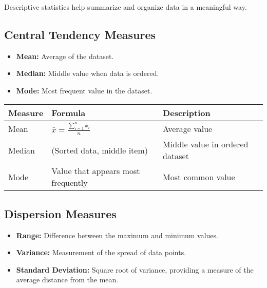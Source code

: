 \documentclass[
  letterpaper,
  DIV=11,
  numbers=noendperiod]{scrreprt}
\providecommand{\tightlist}{%
  \setlength{\itemsep}{0pt}\setlength{\parskip}{0pt}}
\begin{document}
Descriptive statistics help summarize and organize data in a meaningful
way.

\subsection{Central Tendency Measures}\label{central-tendency-measures}

\begin{itemize}
\tightlist
\item
  \textbf{Mean:} Average of the dataset.
\item
  \textbf{Median:} Middle value when data is ordered.
\item
  \textbf{Mode:} Most frequent value in the dataset.
\end{itemize}

\begin{longtable}[]{@{}
  >{\raggedright\arraybackslash}p{}
  >{\raggedright\arraybackslash}p{}
  >{\raggedright\arraybackslash}p{}@{}}
\toprule\noalign{}
\begin{minipage}[b]{\linewidth}\raggedright
Measure
\end{minipage} & \begin{minipage}[b]{\linewidth}\raggedright
Formula
\end{minipage} & \begin{minipage}[b]{\linewidth}\raggedright
Description
\end{minipage} \\
\midrule\noalign{}
\endhead
\bottomrule\noalign{}
\endlastfoot
Mean & \(\bar{x} = \frac{\sum_{i=1}^{n} x_i}{n}\) & Average value \\
Median & (Sorted data, middle item) & Middle value in ordered dataset \\
Mode & Value that appears most frequently & Most common value \\
\end{longtable}

\subsection{Dispersion Measures}\label{dispersion-measures}

\begin{itemize}
\tightlist
\item
  \textbf{Range:} Difference between the maximum and minimum values.
\item
  \textbf{Variance:} Measurement of the spread of data points.
\item
  \textbf{Standard Deviation:} Square root of variance, providing a
  measure of the average distance from the mean.
\end{itemize}
\end{document}
